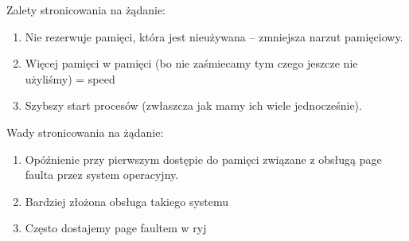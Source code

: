 Zalety stronicowania na żądanie:
\begin{enumerate}
	\item Nie rezerwuje pamięci, która jest nieużywana -- zmniejsza narzut pamięciowy.
	\item Więcej pamięci w pamięci (bo nie zaśmiecamy tym czego jeszcze nie użyliśmy) = speed
	\item Szybszy start procesów (zwłaszcza jak mamy ich wiele jednocześnie).
\end{enumerate}

Wady stronicowania na żądanie:
\begin{enumerate}
	\item Opóźnienie przy pierwszym dostępie do pamięci związane z obsługą page faulta przez system operacyjny.
	\item Bardziej złożona obsługa takiego systemu
	\item Często dostajemy page faultem w ryj
\end{enumerate}

